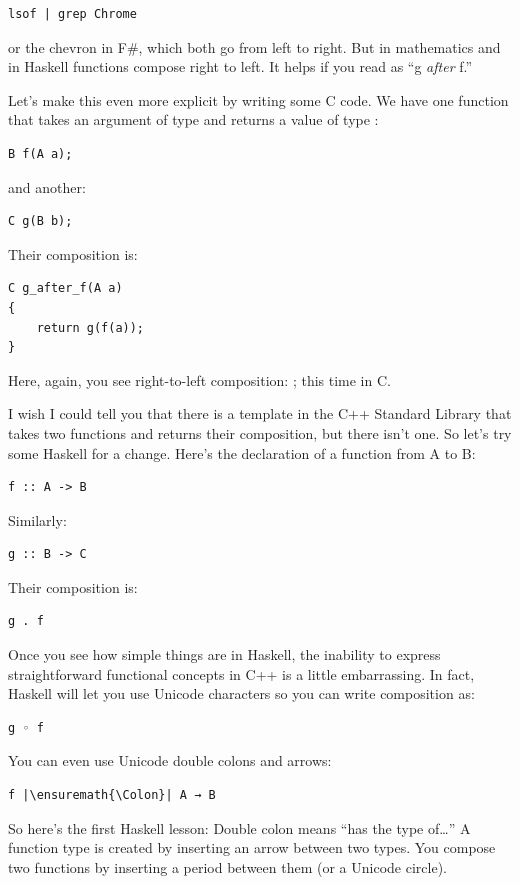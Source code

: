 \begin{verbatim}
lsof | grep Chrome
\end{verbatim}
or the chevron \code{>>} in F\#, which both
go from left to right. But in mathematics and in Haskell functions
compose right to left. It helps if you read  as ``g \emph{after} f.''

Let's make this even more explicit by writing some C code. We have one
function  that takes an argument of type  and
returns a value of type :

\begin{verbatim}
B f(A a);
\end{verbatim}
and another:

\begin{verbatim}
C g(B b);
\end{verbatim}
Their composition is:

\begin{verbatim}
C g_after_f(A a)
{
    return g(f(a));
}
\end{verbatim}
Here, again, you see right-to-left composition: ; this
time in C.

I wish I could tell you that there is a template in the C++ Standard
Library that takes two functions and returns their composition, but
there isn't one. So let's try some Haskell for a change. Here's the
declaration of a function from A to B:

\begin{verbatim}
f :: A -> B
\end{verbatim}
Similarly:

\begin{verbatim}
g :: B -> C
\end{verbatim}
Their composition is:

\begin{verbatim}
g . f
\end{verbatim}
Once you see how simple things are in Haskell, the inability to express
straightforward functional concepts in C++ is a little embarrassing. In
fact, Haskell will let you use Unicode characters so you can write
composition as:

\begin{verbatim}
g ◦ f
\end{verbatim}
You can even use Unicode double colons and arrows:

\begin{verbatim}
f |\ensuremath{\Colon}| A → B
\end{verbatim}
So here's the first Haskell lesson: Double colon means ``has the type
of\ldots{}'' A function type is created by inserting an arrow between
two types. You compose two functions by inserting a period between them
(or a Unicode circle).

